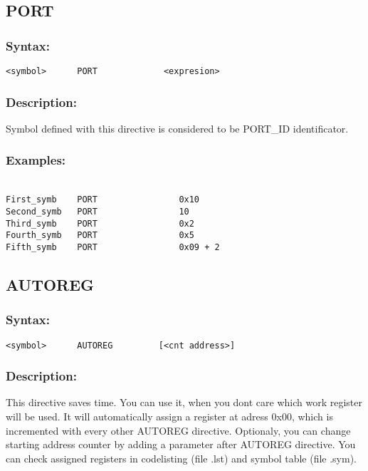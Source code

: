     \subsection{PORT}
        \subsubsection{Syntax:}
            \verb'<symbol>      PORT             <expresion>'

        \subsubsection{Description:}
        Symbol defined with this directive is considered to be PORT\_ID identificator.

        \subsubsection{Examples:}
            {
                ~\\
                \usecodefont
                \verb'First_symb    PORT                0x10    '\\
                \verb'Second_symb   PORT                10      '\\
                \verb'Third_symb    PORT                0x2     '\\
                \verb'Fourth_symb   PORT                0x5     '\\
                \verb'Fifth_symb    PORT                0x09 + 2'\\
            }
    \subsection{AUTOREG}
        \subsubsection{Syntax:}
            \verb'<symbol>      AUTOREG         [<cnt address>]'
            
        \subsubsection{Description:}
        This directive saves time. You can use it, when you dont care which work register will be used. It will automatically assign a register
        at adress 0x00, which is incremented with every other AUTOREG directive. Optionaly, you can change starting address counter by adding a parameter
        after AUTOREG directive. You can check assigned registers in codelisting (file .lst) and symbol table (file .sym).

